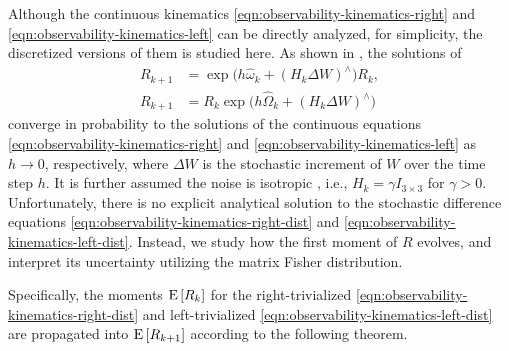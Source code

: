 Although the continuous kinematics \eqref{eqn:observability-kinematics-right} and \eqref{eqn:observability-kinematics-left} can be directly analyzed, for simplicity, the discretized versions of them is studied here.
As shown in \cite{barrau2018stochastic}, the solutions of
\begin{align}
	R_{k+1} &= \exp\!\big( h\hat{\omega}_k + (H_k\Delta W)^\wedge \big) R_k \label{eqn:observability-kinematics-right-dist}, \\
	R_{k+1} &= R_k \exp\!\big( h\hat{\Omega}_k + (H_k\Delta W)^\wedge \big) \label{eqn:observability-kinematics-left-dist}
\end{align}
converge in probability to the solutions of the continuous equations \eqref{eqn:observability-kinematics-right} and \eqref{eqn:observability-kinematics-left} as $h\to 0$, respectively, where $\Delta W$ is the stochastic increment of $W$ over the time step $h$.
It is further assumed the noise is isotropic \cite{barrau2018stochastic}, i.e., $H_k = \gamma I_{3\times 3}$ for $\gamma >0$.
Unfortunately, there is no explicit analytical solution to the stochastic difference equations \eqref{eqn:observability-kinematics-right-dist} and \eqref{eqn:observability-kinematics-left-dist}.
Instead, we study how the first moment of $R$ evolves, and interpret its uncertainty utilizing the matrix Fisher distribution.

Specifically, the moments $\mathrm{E}\left[ R_k \right]$ for the right-trivialized \eqref{eqn:observability-kinematics-right-dist} and left-trivialized \eqref{eqn:observability-kinematics-left-dist} are propagated into $\mathrm{E}\left[ R_{k+1} \right]$ according to the following theorem.

